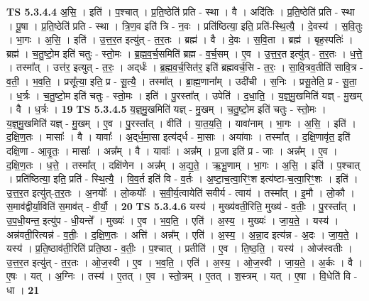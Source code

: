 \documentclass[17pt]{extarticle}
\begin{document}
                  \newline
                                \textbf{ TS 5.3.4.4} \newline
                  अ॒सि॒ । इति॑ । प॒श्चात् । प्र॒ति॒ष्ठेति॑ प्रति - स्था । वै । अदि॑तिः । प्र॒ति॒ष्ठेति॑ प्रति - स्था । पू॒षा । प्र॒ति॒ष्ठेति॑ प्रति - स्था । त्रि॒ण॒व इति॑ त्रि - न॒वः । प्रति॑ष्ठित्या॒ इति॒ प्रति॑-स्थि॒त्यै॒ । दे॒वस्य॑ । स॒वि॒तुः । भा॒गः । अ॒सि॒ । इति॑ । उ॒त्त॒र॒त इत्यु॑त् - त॒र॒तः । ब्रह्म॑ । वै । दे॒वः । स॒वि॒ता । ब्रह्म॑ । बृह॒स्पतिः॑ । ब्रह्म॑ । च॒तु॒ष्टो॒म इति॑ चतुः - स्तो॒मः । ब्र॒ह्म॒व॒र्च॒समिति॑ ब्रह्म - व॒र्च॒सम् । ए॒व । उ॒त्त॒र॒त इत्यु॑त् - त॒र॒तः । ध॒त्ते॒ । तस्मा᳚त् । उत्त॑र॒ इत्युत् - त॒रः॒ । अद्‌र्धः॑ । ब्र॒ह्म॒व॒र्च॒सित॑र॒ इति॑ ब्रह्मवर्च॒सि - त॒रः॒ । सा॒वि॒त्रव॒तीति॑ सावि॒त्र - व॒ती॒ । भ॒व॒ति॒ । प्रसू᳚त्या॒ इति॒ प्र - सू॒त्यै॒ । तस्मा᳚त् । ब्रा॒ह्म॒णाना᳚म् । उदी॑ची । स॒निः । प्रसू॒तेति॒ प्र - सू॒ता॒ । ध॒र्त्रः । च॒तु॒ष्टो॒म इति॑ चतुः - स्तो॒मः । इति॑ । पु॒रस्ता᳚त् । उपेति॑ । द॒धा॒ति॒ । य॒ज्ञ्॒मु॒खमिति॑ यज्ञ् - मु॒खम् । वै । ध॒र्त्रः । \textbf{  19} \newline
                  \newline
                                \textbf{ TS 5.3.4.5} \newline
                  य॒ज्ञ्॒मु॒खमिति॑ यज्ञ् - मु॒खम् । च॒तु॒ष्टो॒म इति॑ चतुः - स्तो॒मः । य॒ज्ञ्॒मु॒खमिति॑ यज्ञ् - मु॒खम् । ए॒व । पु॒रस्ता᳚त् । वीति॑ । या॒त॒य॒ति॒ । यावा॑नाम् । भा॒गः । अ॒सि॒ । इति॑ । द॒क्षि॒ण॒तः । मासाः᳚ । वै । यावाः᳚ । अ॒द्‌र्ध॒मा॒सा इत्य॑द्‌र्ध - मा॒साः । अया॑वाः । तस्मा᳚त् । द॒क्षि॒णावृ॑त॒ इति॑ दक्षि॒णा - आ॒वृ॒तः॒ । मासाः᳚ । अन्न᳚म् । वै । यावाः᳚ । अन्न᳚म् । प्र॒जा इति॑ प्र - जाः । अन्न᳚म् । ए॒व । द॒क्षि॒ण॒तः । ध॒त्ते॒ । तस्मा᳚त् । दक्षि॑णेन । अन्न᳚म् । अ॒द्य॒ते॒ । ऋ॒भू॒णाम् । भा॒गः । अ॒सि॒ । इति॑ । प॒श्चात् । प्रति॑ष्ठित्या॒ इति॒ प्रति॑ - स्थि॒त्यै॒ । वि॒व॒र्त इति॑ वि - व॒र्तः । अ॒ष्टा॒च॒त्वा॒रिꣳ॒॒श इत्य॑ष्टा-च॒त्वा॒रिꣳ॒॒शः । इति॑ । उ॒त्त॒र॒त इत्यु॑त्-त॒र॒तः । अ॒नयोः᳚ । लो॒कयोः᳚ । स॒वी॒र्य॒त्वायेति॑ सवीर्य - त्वाय॑ । तस्मा᳚त् । इ॒मौ । लो॒कौ । स॒माव॑द्वीर्या॒विति॑ स॒माव॑त् - वी॒र्यौ॒ । \textbf{  20} \newline
                  \newline
                                \textbf{ TS 5.3.4.6} \newline
                  यस्य॑ । मुख्य॑वती॒रिति॒ मुख्य॑ - व॒तीः॒ । पु॒रस्ता᳚त् । उ॒प॒धी॒यन्त॒ इत्यु॑प - धी॒यन्ते᳚ । मुख्यः॑ । ए॒व । भ॒व॒ति॒ । एति॑ । अ॒स्य॒ । मुख्यः॑ । जा॒य॒ते॒ । यस्य॑ । अन्न॑वती॒रित्यन्न॑ - व॒तीः॒ । द॒क्षि॒ण॒तः । अत्ति॑ । अन्न᳚म् । एति॑ । अ॒स्य॒ । अ॒न्ना॒द इत्य॑न्न - अ॒दः । जा॒य॒ते॒ । यस्य॑ । प्र॒ति॒ष्ठाव॑ती॒रिति॑ प्रति॒ष्ठा - व॒तीः॒ । प॒श्चात् । प्रतीति॑ । ए॒व । ति॒ष्ठ॒ति॒ । यस्य॑ । ओज॑स्वतीः । उ॒त्त॒र॒त इत्यु॑त् - त॒र॒तः । ओ॒ज॒स्वी । ए॒व । भ॒व॒ति॒ । एति॑ । अ॒स्य॒ । ओ॒ज॒स्वी । जा॒य॒ते॒ । अ॒र्कः । वै । ए॒षः । यत् । अ॒ग्निः । तस्य॑ । ए॒तत् । ए॒व । स्तो॒त्रम् । ए॒तत् । श॒स्त्रम् । यत् । ए॒षा । वि॒धेति॑ वि - धा । \textbf{  21} \newline
\end{document}
